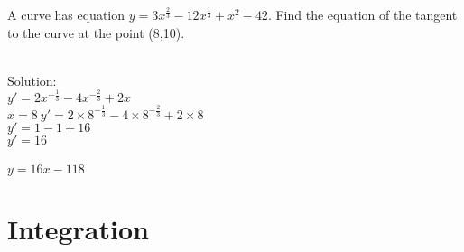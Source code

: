\begin{exercise}
    A curve has equation $ y=3x^{\scriptstyle \frac{2}{3}} - 12x^{\scriptstyle \frac{1}{3}} + x^2 -42$. Find the equation of the tangent to the curve at the point (8,10).\\ \\
\end{exercise}


\begin{solution}    
    Solution: \\
    $ y'=2x^{\scriptstyle -\frac{1}{3}} - 4x^{\scriptstyle -\frac{2}{3}} + 2x $  \\
    $ x=8 \> y'= 2 \times 8^{\scriptstyle -\frac{1}{3}} - 4 \times 8^{\scriptstyle -\frac{2}{3}} + 2 \times 8 $ \\
    $ y'= 1 - 1 + 16     $ \\
    $ y'=16  $ \\
    \\
    $ y = 16x-118 $    
     
\end{solution}




\section{Integration}



\printallsolutions